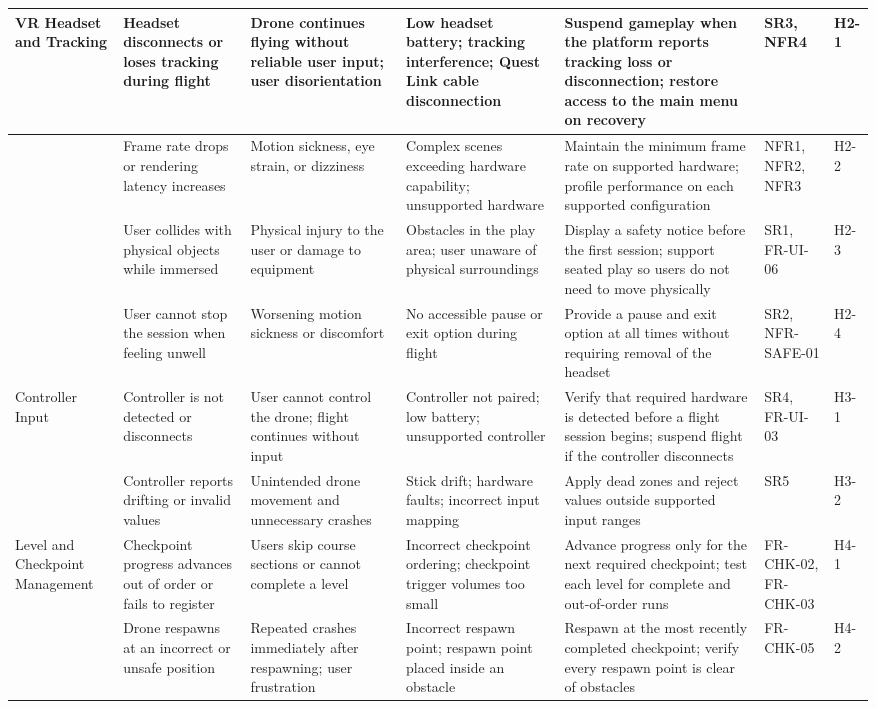 \documentclass{article}
\newcommand{\reqref}[1]{#1}
\begin{document}
\begin{landscape}
\begin{longtable}{|L{1.9cm}|L{2.6cm}|L{3.0cm}|L{2.8cm}|L{3.8cm}|L{1.9cm}|L{0.8cm}|}
VR Headset and Tracking &
Headset disconnects or loses tracking during flight &
Drone continues flying without reliable user input; user disorientation &
Low headset battery; tracking interference; Quest Link cable disconnection &
Suspend gameplay when the platform reports tracking loss or disconnection;
restore access to the main menu on recovery &
\reqref{SR3}, \reqref{NFR4} &
H2-1 \\
\hline
&
Frame rate drops or rendering latency increases &
Motion sickness, eye strain, or dizziness &
Complex scenes exceeding hardware capability; unsupported hardware &
Maintain the minimum frame rate on supported hardware; profile performance on
each supported configuration &
\reqref{NFR1}, \reqref{NFR2}, \reqref{NFR3} &
H2-2 \\
\hline
&
User collides with physical objects while immersed &
Physical injury to the user or damage to equipment &
Obstacles in the play area; user unaware of physical surroundings &
Display a safety notice before the first session; support seated play so users
do not need to move physically &
\reqref{SR1}, FR-UI-06 &
H2-3 \\
\hline
&
User cannot stop the session when feeling unwell &
Worsening motion sickness or discomfort &
No accessible pause or exit option during flight &
Provide a pause and exit option at all times without requiring removal of the
headset &
\reqref{SR2}, NFR-SAFE-01 &
H2-4 \\
\hline

Controller Input &
Controller is not detected or disconnects &
User cannot control the drone; flight continues without input &
Controller not paired; low battery; unsupported controller &
Verify that required hardware is detected before a flight session begins;
suspend flight if the controller disconnects &
\reqref{SR4}, FR-UI-03 &
H3-1 \\
\hline
&
Controller reports drifting or invalid values &
Unintended drone movement and unnecessary crashes &
Stick drift; hardware faults; incorrect input mapping &
Apply dead zones and reject values outside supported input ranges &
\reqref{SR5} &
H3-2 \\
\hline

Level and Checkpoint Management &
Checkpoint progress advances out of order or fails to register &
Users skip course sections or cannot complete a level &
Incorrect checkpoint ordering; checkpoint trigger volumes too small &
Advance progress only for the next required checkpoint; test each level for
complete and out-of-order runs &
FR-CHK-02, FR-CHK-03 &
H4-1 \\
\hline
&
Drone respawns at an incorrect or unsafe position &
Repeated crashes immediately after respawning; user frustration &
Incorrect respawn point; respawn point placed inside an obstacle &
Respawn at the most recently completed checkpoint; verify every respawn point is
clear of obstacles &
FR-CHK-05 &
H4-2 \\
\hline


\end{longtable}
\end{landscape}
\end{document}
